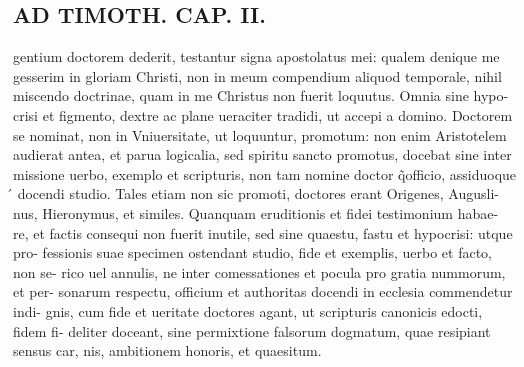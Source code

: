 \documentclass{article}
\begin{document}
\begin{pages}
\section*{AD TIMOTH. CAP. II. }
\marginpar{[ p.485 ]}\pstart gentium doctorem dederit, testantur signa apostolatus mei: qualem denique me gesserim in gloriam Christi, non in meum compendium aliquod temporale, nihil miscendo doctrinae, quam in me Christus non fuerit loquutus. Omnia sine hypo- crisi et figmento, dextre ac plane ueraciter tradidi, ut accepi a domino. Doctorem se nominat, non in Vniuersitate, ut loquuntur, promotum: non enim Aristotelem audierat antea, et parua logicalia, sed spiritu sancto promotus, docebat sine inter missione uerbo, exemplo et scripturis, non tam nomine doctor q̃officio, assiduoque ́ docendi studio. Tales etiam non sic promoti, doctores erant Origenes, Augusli- nus, Hieronymus, et similes. Quanquam eruditionis et fidei testimonium habae- re, et factis consequi non fuerit inutile, sed sine quaestu, fastu et hypocrisi: utque pro- fessionis suae specimen ostendant studio, fide et exemplis, uerbo et facto, non se- rico uel annulis, ne inter comessationes et pocula pro gratia nummorum, et per- sonarum respectu, officium et authoritas docendi in ecclesia commendetur indi- gnis, cum fide et ueritate doctores agant, ut scripturis canonicis edocti, fidem fi- deliter doceant, sine permixtione falsorum dogmatum, quae resipiant sensus car, nis, ambitionem honoris, et quaesitum.  \pend
{}
{}

\end{pages}
\end{document}

